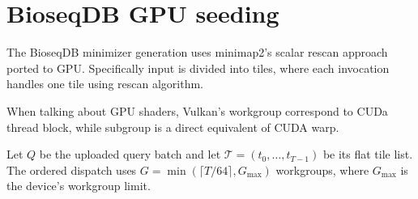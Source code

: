 \section{BioseqDB GPU seeding}
\label{sec:vulkan-minimizer-scheduling}

The BioseqDB minimizer generation uses minimap2's scalar rescan approach ported to GPU. Specifically input is divided into tiles, where each invocation handles one tile using rescan algorithm.

When talking about GPU shaders, Vulkan's workgroup correspond to CUDa thread block, while subgroup is a direct equivalent of CUDA warp. 

Let $Q$ be the uploaded query batch and let
$\mathcal T=(t_0,\ldots,t_{T-1})$ be its flat tile list.  The ordered dispatch
uses
$G=\min(\lceil T/64\rceil,G_{\max})$ workgroups, where $G_{\max}$ is the
device's workgroup limit.

